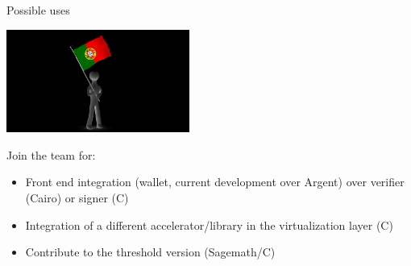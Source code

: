 \documentclass[aspectratio=43]{beamer}
\begin{document}

\begin{frame}{Possible uses}

\begin{center}
\includegraphics[width=6cm]{images/lisbon.png}
\end{center}

Join the team for:
\begin{itemize}
\item Front end integration (wallet, current development over Argent) over verifier (Cairo) or signer (C)
\item Integration of a different accelerator/library in the virtualization layer (C)
\item Contribute to the threshold version (Sagemath/C)
\end{itemize} 

\end{frame} 
\end{document}
